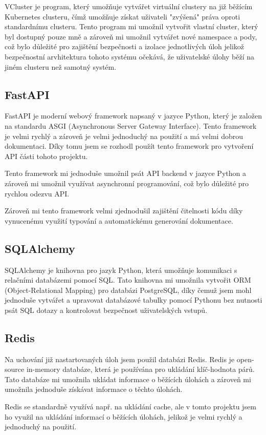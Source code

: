 \documentclass[12pt, a4paper,
oneside,      %
openright
]{report}
\begin{document}
VCluster je program, který umožňuje vytvářet virtuální clustery na již běžícím Kubernetes clusteru, čímž umožňuje získat uživateli "zvýšená" práva oproti standardnímu clusteru. Tento program mi umožnil vytvořit vlastní cluster, který byl dostupný pouze mně a zároveň mi umožnil vytvářet nové namespace a pody, což bylo důležité pro zajištění bezpečnosti a izolace jednotlivých úloh jelikož bezpečnostní arvhitektura tohoto systému očekává, že uživatelské úlohy běží na jiném clusteru než samotný systém.

\subsection{FastAPI}
FastAPI je moderní webový framework napsaný v jazyce Python, který je založen na standardu ASGI (Asynchronous Server Gateway Interface). Tento framework je velmi rychlý a zároveň je velmi jednoduchý na použití a má velmi dobrou dokumentaci. Díky tomu jsem se rozhodl použít tento framework pro vytvoření API části tohoto projektu.

Tento framework mi jednoduše umožnil psát API backend v jazyce Python a zároveň mi umožnil využívat asynchronní programování, což bylo důležité pro rychlou odezvu API.

Zároveň mi tento framework velmi zjednodušil zajištění čitelnosti kódu díky vynucenému využití typování a automatickému generování dokumentace.

\subsection{SQLAlchemy}
SQLAlchemy je knihovna pro jazyk Python, která umožňuje komunikaci s relačními databázemi pomocí SQL. Tato knihovna mi umožnila vytvořit ORM (Object-Relational Mapping) pro databázi PostgreSQL, díky čemuž jsem mohl jednoduše vytvářet a upravovat databázové tabulky pomocí Pythonu bez nutnosti psát SQL dotazy a kontrolovat bezpečnost uživatelských vstupů.

\subsection{Redis}
Na uchování již nastartovaných úloh jsem použil databázi Redis. Redis je open-source in-memory databáze, která je používána pro ukládání klíč-hodnota párů. Tato databáze mi umožnila ukládat informace o běžících úlohách a zároveň mi umožnila jednoduše získávat informace o těchto úlohách.

Redis se standardně využívá např. na ukládání cache, ale v tomto projektu jsem ho využil na ukládání informací o běžících úlohách, jelikož je velmi rychlý a jednoduchý na použití.
\end{document}
